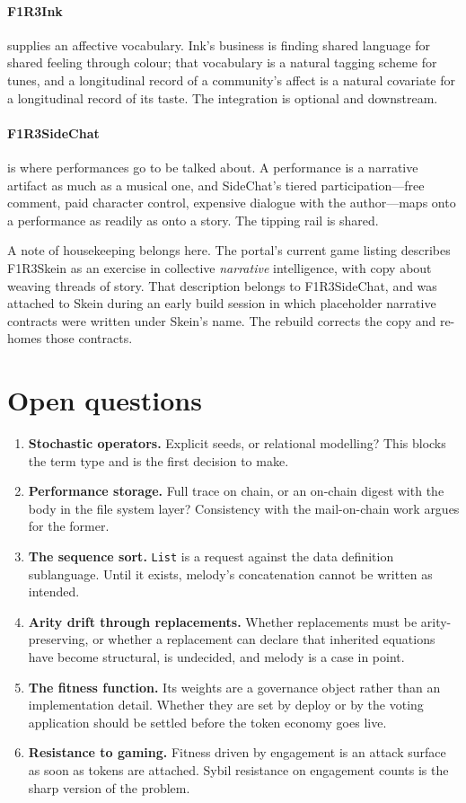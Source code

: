 \documentclass[11pt,a4paper]{article}
\theoremstyle{definition}
\theoremstyle{plain}
\begin{document}
\paragraph{F1R3Ink} supplies an affective vocabulary. Ink's business is finding shared language for
shared feeling through colour; that vocabulary is a natural tagging scheme for tunes, and a
longitudinal record of a community's affect is a natural covariate for a longitudinal record of its
taste. The integration is optional and downstream.

\paragraph{F1R3SideChat} is where performances go to be talked about. A performance is a narrative
artifact as much as a musical one, and SideChat's tiered participation---free comment, paid
character control, expensive dialogue with the author---maps onto a performance as readily as onto a
story. The tipping rail is shared.

\medskip

\noindent A note of housekeeping belongs here. The portal's current game listing describes F1R3Skein
as an exercise in collective \emph{narrative} intelligence, with copy about weaving threads of story.
That description belongs to F1R3SideChat, and was attached to Skein during an early build session in
which placeholder narrative contracts were written under Skein's name. The rebuild corrects the copy
and re-homes those contracts.

\section{Open questions}

\begin{enumerate}
\itemsep0.35em
\item \textbf{Stochastic operators.} Explicit seeds, or relational modelling? This blocks the term
type and is the first decision to make.
\item \textbf{Performance storage.} Full trace on chain, or an on-chain digest with the body in the
file system layer? Consistency with the mail-on-chain work argues for the former.
\item \textbf{The sequence sort.} \texttt{List} is a request against the data definition
sublanguage. Until it exists, melody's concatenation cannot be written as intended.
\item \textbf{Arity drift through replacements.} Whether replacements must be arity-preserving, or
whether a replacement can declare that inherited equations have become structural, is undecided,
and melody is a case in point.
\item \textbf{The fitness function.} Its weights are a governance object rather than an
implementation detail. Whether they are set by deploy or by the voting application should be settled
before the token economy goes live.
\item \textbf{Resistance to gaming.} Fitness driven by engagement is an attack surface as soon as
tokens are attached. Sybil resistance on engagement counts is the sharp version of the problem.
\end{enumerate}
\end{document}
